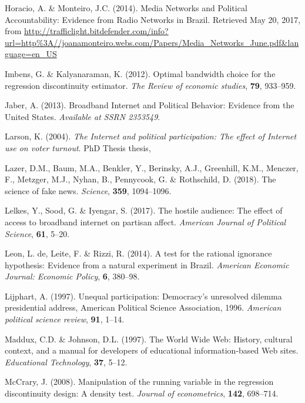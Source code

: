 \documentclass[
  12pt,
]{article}
\begin{document}
\leavevmode\hypertarget{ref-horacio_media_2014}{}%
Horacio, A. \& Monteiro, J.C. (2014). Media Networks and Political
Accountability: Evidence from Radio Networks in Brazil. Retrieved May
20, 2017, from
\url{http://trafficlight.bitdefender.com/info?url=http\%3A//joanamonteiro.webs.com/Papers/Media_Networks_June.pdf\&language=en_US}

\leavevmode\hypertarget{ref-imbens_optimal_2012}{}%
Imbens, G. \& Kalyanaraman, K. (2012). Optimal bandwidth choice for the
regression discontinuity estimator. \emph{The Review of economic
studies}, \textbf{79}, 933--959.

\leavevmode\hypertarget{ref-jaber_broadband_2013}{}%
Jaber, A. (2013). Broadband Internet and Political Behavior: Evidence
from the United States. \emph{Available at SSRN 2353549}.

\leavevmode\hypertarget{ref-larson_internet_2004}{}%
Larson, K. (2004). \emph{The Internet and political participation: The
effect of Internet use on voter turnout}. PhD Thesis thesis,

\leavevmode\hypertarget{ref-lazer_science_2018}{}%
Lazer, D.M., Baum, M.A., Benkler, Y., Berinsky, A.J., Greenhill, K.M.,
Menczer, F., Metzger, M.J., Nyhan, B., Pennycook, G. \& Rothschild, D.
(2018). The science of fake news. \emph{Science}, \textbf{359},
1094--1096.

\leavevmode\hypertarget{ref-lelkes_hostile_2017}{}%
Lelkes, Y., Sood, G. \& Iyengar, S. (2017). The hostile audience: The
effect of access to broadband internet on partisan affect.
\emph{American Journal of Political Science}, \textbf{61}, 5--20.

\leavevmode\hypertarget{ref-de_leon_test_2014}{}%
Leon, L. de, Leite, F. \& Rizzi, R. (2014). A test for the rational
ignorance hypothesis: Evidence from a natural experiment in Brazil.
\emph{American Economic Journal: Economic Policy}, \textbf{6}, 380--98.

\leavevmode\hypertarget{ref-lijphart_unequal_1997}{}%
Lijphart, A. (1997). Unequal participation: Democracy's unresolved
dilemma presidential address, American Political Science Association,
1996. \emph{American political science review}, \textbf{91}, 1--14.

\leavevmode\hypertarget{ref-maddux_world_1997}{}%
Maddux, C.D. \& Johnson, D.L. (1997). The World Wide Web: History,
cultural context, and a manual for developers of educational
information-based Web sites. \emph{Educational Technology}, \textbf{37},
5--12.

\leavevmode\hypertarget{ref-mccrary_manipulation_2008}{}%
McCrary, J. (2008). Manipulation of the running variable in the
regression discontinuity design: A density test. \emph{Journal of
econometrics}, \textbf{142}, 698--714.
\end{document}
